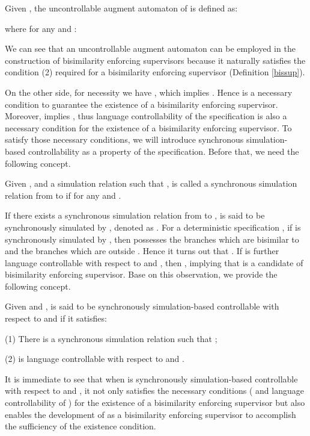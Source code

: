 \documentclass[preprint,authoryear,12pt]{elsarticle}
\begin{document}
\begin{Definition}
Given , the
uncontrollable augment automaton  of  is defined as:

where for any  and :

\end{Definition}

We can see that an uncontrollable augment automaton can be
employed in the construction of bisimilarity enforcing supervisors
because it naturally satisfies the condition (2) required for a
bisimilarity enforcing supervisor (Definition \ref{bissup}).


On the other side, for necessity we have , which
implies . Hence  is a necessary
condition to guarantee the existence of a bisimilarity enforcing
supervisor. Moreover,  implies , thus
language controllability of the specification is also a necessary
condition for the existence of a bisimilarity enforcing
supervisor. To satisfy those necessary conditions, we will
introduce synchronous simulation-based controllability as a
property of the specification. Before that, we need the following
concept.


\begin{Definition}
Given ,  and a simulation
relation  such that ,  is
called a synchronous simulation relation from  to  if
 for any  and .
\end{Definition}

If there exists a synchronous simulation relation  from
 to ,  is said to be synchronously simulated by
, denoted as . For a deterministic
specification , if  is synchronously simulated by , then
 possesses the branches which are bisimilar to  and the
branches which are outside . Hence it turns out that . If  is further language controllable with respect to
 and , then , implying that
 is a candidate of bisimilarity enforcing supervisor. Base
on this observation, we provide the following concept.





\begin{Definition}\label{syncdef}
Given  and ,  is said to be
synchronously simulation-based controllable with respect to 
and  if it satisfies:

(1) There is a synchronous simulation relation  such that
;

(2)  is language controllable with respect to  and
.

\end{Definition}

It is immediate to see that when  is synchronously
simulation-based controllable with respect to  and
, it not only satisfies the necessary conditions ( and language controllability of ) for the existence
of a bisimilarity enforcing supervisor but also enables the
development of  as a bisimilarity enforcing supervisor to
accomplish the sufficiency of the existence condition.
\end{document}
